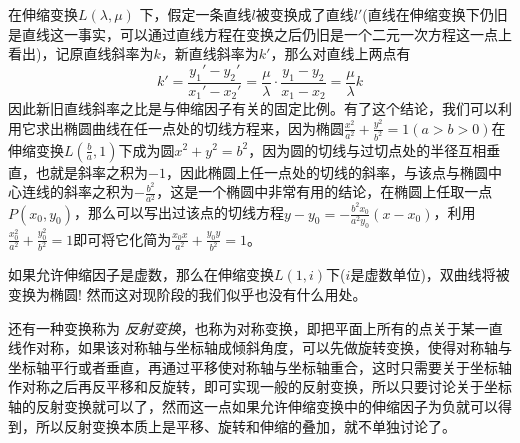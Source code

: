 \begin{example}
  \label{ep:the-tangent-after-scale-translation}
  在伸缩变换$L(\lambda, \mu)$ 下，假定一条直线$l$被变换成了直线$l'$(直线在伸缩变换下仍旧是直线这一事实，可以通过直线方程在变换之后仍旧是一个二元一次方程这一点上看出)，记原直线斜率为$k$，新直线斜率为$k'$，那么对直线上两点有
  \begin{equation}
    \label{eq:tangent-of-scale-translation}
  k'=\frac{y_1'-y_2'}{x_1'-x_2'}=\frac{\mu}{\lambda}\cdot \frac{y_1-y_2}{x_1-x_2}=\frac{\mu}{\lambda}k
  \end{equation}
因此新旧直线斜率之比是与伸缩因子有关的固定比例。有了这个结论，我们可以利用它求出椭圆曲线在任一点处的切线方程来，因为椭圆$\frac{x^2}{a^2}+\frac{y^2}{b^2}=1(a>b>0)$在伸缩变换$L(\frac{b}{a},1)$下成为圆$x^2+y^2=b^2$，因为圆的切线与过切点处的半径互相垂直，也就是斜率之积为$-1$，因此椭圆上任一点处的切线的斜率，与该点与椭圆中心连线的斜率之积为$-\frac{b^2}{a^2}$，这是一个椭圆中非常有用的结论，在椭圆上任取一点$P(x_0,y_0)$，那么可以写出过该点的切线方程$y-y_0=-\frac{b^2x_0}{a^2y_0}(x-x_0)$，利用$\frac{x_0^2}{a^2}+\frac{y_0^2}{b^2}=1$即可将它化简为$\frac{x_0x}{a^2}+\frac{y_0y}{b^2}=1$。
\end{example}

\begin{example}
  如果允许伸缩因子是虚数，那么在伸缩变换$L(1,i)$下($i$是虚数单位)，双曲线将被变换为椭圆! 然而这对现阶段的我们似乎也没有什么用处。
\end{example}

还有一种变换称为 \emph{反射变换}，也称为对称变换，即把平面上所有的点关于某一直线作对称，如果该对称轴与坐标轴成倾斜角度，可以先做旋转变换，使得对称轴与坐标轴平行或者垂直，再通过平移使对称轴与坐标轴重合，这时只需要关于坐标轴作对称之后再反平移和反旋转，即可实现一般的反射变换，所以只要讨论关于坐标轴的反射变换就可以了，然而这一点如果允许伸缩变换中的伸缩因子为负就可以得到，所以反射变换本质上是平移、旋转和伸缩的叠加，就不单独讨论了。



